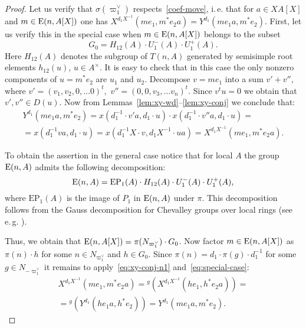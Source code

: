\begin{proof}
    Let us verify that $\sigma(\varpi^\vee_1)$ respects~\eqref{coef-move}, i.\,e. that for $a\in XA[X]$ and $m \in \operatorname{E}(n, A[X])$ one has
    $X^{d_1 X^{-1}}(me_1, m^*e_2 a) = Y^{d_1}(me_1 a, m^* e_2)$.
    First, let us verify this in the special case when $m \in \operatorname{E}(n, A[X])$ belongs to the subset
    \[G_0 = H_{12}(A) \cdot U^-_1(A) \cdot U^+_1(A).\]
    Here $H_{12}(A)$ denotes the subgroup of $T(n, A)$ generated by semisimple root elements $h_{12}(u)$, $u \in A^\times$.
    It is easy to check that in this case the only nonzero components of $u = m^* e_2$ are $u_1$ and $u_2$.
    Decompose $v = m e_1$ into a sum $v' + v''$, where $v' = (v_1, v_2, 0, \ldots 0)^t,$ $v'' = (0, 0, v_3, \ldots v_n)^t$.
    Since $v^t u = 0$ we obtain that $v', v'' \in D(u)$.
    Now from Lemmas~\ref{lem:xy-wd}--\ref{lem:xy-conj} we conclude that:
    \begin{multline}
        \label{eq:special-case}
        Y^{d_1}(me_{1}a, m^* e_2) = x(d_1^{-1} \cdot v'a, d_1\cdot  u) \cdot x(d_1^{-1}\cdot v''a, d_1 \cdot u) = \\
        = x(d_1^{-1} va, d_1 \cdot u) = x(d_1^{-1}X \cdot v, d_{1}X^{-1} \cdot u a) = X^{d_1 X^{-1}}(me_1, m^*e_2 a).
    \end{multline}

    To obtain the assertion in the general case notice that for local $A$ the group $\operatorname{E}(n, A)$ admits the following decomposition:
    \[\operatorname{E}(n, A) = \mathrm{EP}_1(A) \cdot H_{12}(A) \cdot U^-_1(A) \cdot U^+_1(A), \]
    where $\mathrm{EP}_1(A)$ is the image of $P_1$ in $\operatorname{E}(n, A)$ under $\pi$.
    This decomposition follows from the Gauss decomposition for Chevalley groups over local rings (see e.\,g. \cite[Theorem~1.1]{Sm12}).

    Thus, we obtain that $\operatorname{E}(n, A[X]) = \pi(N_{\varpi_1^\vee}) \cdot G_0$.
    Now factor $m \in \operatorname{E}(n, A[X])$ as $\pi(n) \cdot h$ for some $n\in N_{\varpi_1^\vee}$ and $h \in G_0$.
    Since $\pi(n) = d_1 \cdot \pi(g) \cdot d_1^{-1}$ for some $g \in N_{-\varpi_1^\vee}$ it remains to apply~\eqref{eq:xy-conj-n1} and~\eqref{eq:special-case}:
    \begin{multline}
        \nonumber X^{d_1 X^{-1}}(me_1, m^*e_{2}a) = {}^{g}(X^{d_1 X^{-1}}(he_1, h^*e_{2}a)) = \\
        = {}^{g}(Y^{d_1}(he_{1}a, h^*e_2)) = Y^{d_1}(me_{1}a, m^{*} e_{2}).
    \end{multline}
\end{proof}

